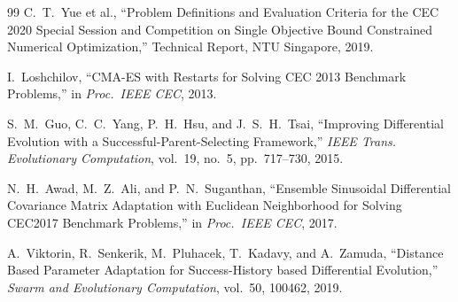 \documentclass[11pt]{article}
\begin{document}
\begin{thebibliography}{99}
C.~T.~Yue et al.,
``Problem Definitions and Evaluation Criteria for the CEC 2020 Special Session and Competition on Single Objective Bound Constrained Numerical Optimization,''
Technical Report, NTU Singapore, 2019.

I.~Loshchilov,
``CMA-ES with Restarts for Solving CEC 2013 Benchmark Problems,''
in \textit{Proc.~IEEE CEC}, 2013.

S.~M.~Guo, C.~C.~Yang, P.~H.~Hsu, and J.~S.~H.~Tsai,
``Improving Differential Evolution with a Successful-Parent-Selecting Framework,''
\textit{IEEE Trans. Evolutionary Computation}, vol.~19, no.~5, pp.~717--730, 2015.

N.~H.~Awad, M.~Z.~Ali, and P.~N.~Suganthan,
``Ensemble Sinusoidal Differential Covariance Matrix Adaptation with Euclidean Neighborhood for Solving CEC2017 Benchmark Problems,''
in \textit{Proc.~IEEE CEC}, 2017.

A.~Viktorin, R.~Senkerik, M.~Pluhacek, T.~Kadavy, and A.~Zamuda,
``Distance Based Parameter Adaptation for Success-History based Differential Evolution,''
\textit{Swarm and Evolutionary Computation}, vol.~50, 100462, 2019.

\end{thebibliography}
\end{document}
